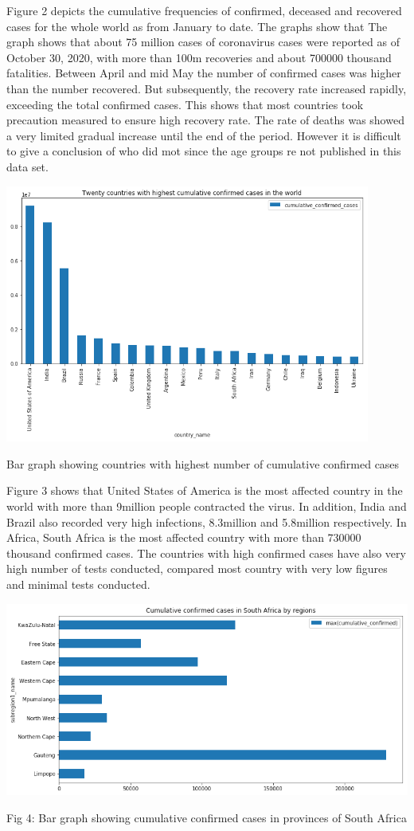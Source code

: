 \documentclass[12pt]{article}
\begin{document}
Figure 2 depicts the cumulative frequencies of confirmed, deceased and recovered cases for the whole world as from January to date.  The graphs show that
The graph shows that about 75 million cases of coronavirus cases were reported as of October 30, 2020, with more than 100m recoveries and about 700000 thousand fatalities. Between April and mid May the number of confirmed  cases was higher than the number recovered. But subsequently, the recovery rate increased rapidly, exceeding the total confirmed cases. This shows that most countries took precaution measured to ensure high recovery rate. The rate of deaths was showed a very limited gradual increase until the end of the period. However it is difficult to give a conclusion of who did mot since the age groups re not published in this data set.  

\includegraphics[width=0.9\textwidth, inner]{bar1.png}
\caption{Bar graph showing countries with highest number of cumulative confirmed cases}


Figure 3 shows that United States of America is the most affected country in the world with more than 9million people contracted the virus. In addition, India and Brazil also recorded very high infections, 8.3million and 5.8million respectively. In Africa, South Africa is the most affected country with more than 730000 thousand confirmed cases. The countries with high confirmed cases have also very high number of tests conducted, compared most country with very low figures and minimal tests conducted. 


\includegraphics[width=0.9\linewidth, inner]{bar2.png}
\caption{Fig 4: Bar graph showing cumulative confirmed cases in provinces of South Africa}
\end{document}

